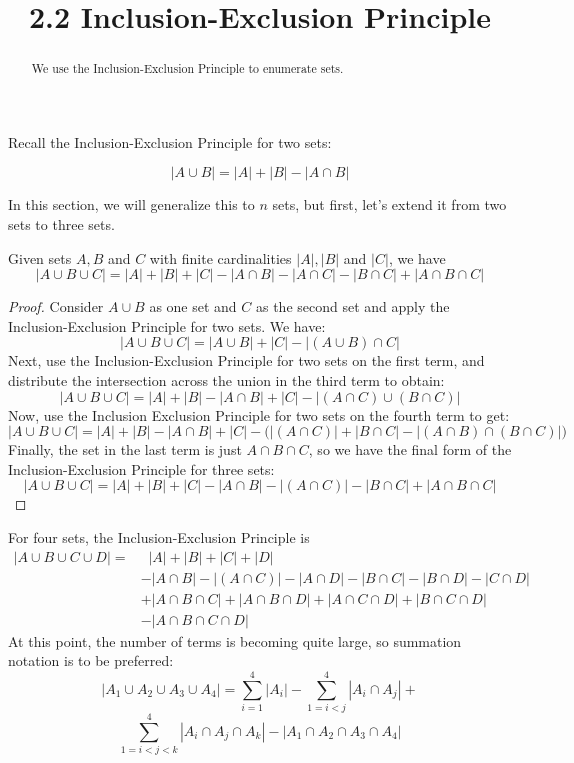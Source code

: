 \documentclass[handout]{ximera}
\title{2.2 Inclusion-Exclusion Principle}
\begin{document}
\begin{abstract}
We use the Inclusion-Exclusion Principle to enumerate sets.
\end{abstract}

\maketitle


Recall the Inclusion-Exclusion Principle for two sets:

\[
|A \cup B| = |A| + |B| - |A \cap B|
\]

In this section, we will generalize this to $n$ sets, but first, let's extend it from two sets to three sets.

\begin{proposition}
Given sets $A, B$ and $C$ with finite cardinalities $|A|, |B|$ and $|C|$, we have
\[
|A \cup B \cup C| = |A| + |B| + |C| - |A \cap B| - |A \cap C| - |B \cap C| + |A \cap B \cap C|
\]
\end{proposition}




\begin{proof}
Consider $A \cup B$ as one set and $C$ as the second set and apply the 
Inclusion-Exclusion Principle for two sets.  We have:
\[
|A \cup B \cup C| = |A \cup B| + |C| - | (A\cup B) \cap C|
\]
Next, use the Inclusion-Exclusion Principle for two sets on the first term, and 
distribute the intersection across the union in the third term to obtain:
\[
|A \cup B \cup C| = |A| + |B| - |A \cap B| + |C| - | (A \cap C) \cup (B\cap C) |
\]
Now, use the Inclusion Exclusion Principle for two sets on the fourth term to get:
\[
|A \cup B \cup C| = |A| + |B| - |A \cap B| + |C| - \bigg(| (A \cap C)| + |B\cap C| - |(A\cap B) \cap (B\cap C)| \bigg)
\]
Finally, the set in the last term is just $A \cap B \cap C$, so we have the final form of the 
Inclusion-Exclusion Principle for three sets:
\[
|A \cup B \cup C| = |A| + |B| + |C| - |A \cap B| - | (A \cap C)| - |B\cap C| +|A\cap B\cap C|
\]
\end{proof}



For four sets, the Inclusion-Exclusion Principle is
\begin{align*}
|A \cup B \cup C \cup D | = &\;\;|A|  + |B| + |C| + |D| \\
&- |A \cap B| - | (A \cap C)| - |A \cap D| - |B\cap C| - | B \cap D| 
- |C \cap D| \\
& +|A\cap B\cap C| + |A\cap B\cap D|+|A\cap C\cap D|+| B\cap C\cap D| \\
&- |A\cap B\cap C \cap D|
\end{align*}
At this point, the number of terms is becoming quite large, so summation notation is to be preferred:
\[
|A_1 \cup A_2 \cup A_3 \cup A_4 | = \sum_{i = 1}^4 |A_i| - \sum_{1 = i < j}^4 |A_i \cap A_j| + 
\]
\[
\sum_{1 = i < j< k }^4 |A_i \cap A_j \cap A_k| - |A_1 \cap A_2 \cap A_3 \cap A_4 |
\]
\end{document}
